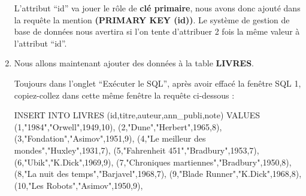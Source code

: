 \documentclass[
  a4paper,
  DIV=11,
  numbers=noendperiod]{scrartcl}
\newenvironment{Shaded}{\begin{snugshade}}{\end{snugshade}}
\newcommand{\DecValTok}[1]{\textcolor[rgb]{0.68,0.00,0.00}{#1}}
\newcommand{\KeywordTok}[1]{\textcolor[rgb]{0.00,0.23,0.31}{#1}}
\newcommand{\NormalTok}[1]{\textcolor[rgb]{0.00,0.23,0.31}{#1}}
\newcommand{\OtherTok}[1]{\textcolor[rgb]{0.00,0.23,0.31}{#1}}
\begin{document}
\begin{enumerate}
  L'attribut ``id'' va jouer le rôle de \textbf{clé primaire}, nous
  avons donc ajouté dans la requête la mention \textbf{(PRIMARY KEY
  (id))}. Le système de gestion de base de données nous avertira si l'on
  tente d'attribuer 2 fois la même valeur à l'attribut ``id''.
\item
  Nous allons maintenant ajouter des données à la table \textbf{LIVRES}.

  Toujours dans l'onglet ``Exécuter le SQL'', après avoir effacé la
  fenêtre SQL 1, copiez-collez dans cette même fenêtre la requête
  ci-dessous :

\begin{Shaded}
\begin{Highlighting}[]
\KeywordTok{INSERT} \KeywordTok{INTO}\NormalTok{ LIVRES}
\NormalTok{    (}\KeywordTok{id}\NormalTok{,titre,auteur,ann\_publi,note)}
    \KeywordTok{VALUES}
\NormalTok{    (}\DecValTok{1}\NormalTok{,}\OtherTok{"1984"}\NormalTok{,}\OtherTok{"Orwell"}\NormalTok{,}\DecValTok{1949}\NormalTok{,}\DecValTok{10}\NormalTok{),}
\NormalTok{    (}\DecValTok{2}\NormalTok{,}\OtherTok{"Dune"}\NormalTok{,}\OtherTok{"Herbert"}\NormalTok{,}\DecValTok{1965}\NormalTok{,}\DecValTok{8}\NormalTok{),}
\NormalTok{    (}\DecValTok{3}\NormalTok{,}\OtherTok{"Fondation"}\NormalTok{,}\OtherTok{"Asimov"}\NormalTok{,}\DecValTok{1951}\NormalTok{,}\DecValTok{9}\NormalTok{),}
\NormalTok{    (}\DecValTok{4}\NormalTok{,}\OtherTok{"Le meilleur des mondes"}\NormalTok{,}\OtherTok{"Huxley"}\NormalTok{,}\DecValTok{1931}\NormalTok{,}\DecValTok{7}\NormalTok{),}
\NormalTok{    (}\DecValTok{5}\NormalTok{,}\OtherTok{"Fahrenheit 451"}\NormalTok{,}\OtherTok{"Bradbury"}\NormalTok{,}\DecValTok{1953}\NormalTok{,}\DecValTok{7}\NormalTok{),}
\NormalTok{    (}\DecValTok{6}\NormalTok{,}\OtherTok{"Ubik"}\NormalTok{,}\OtherTok{"K.Dick"}\NormalTok{,}\DecValTok{1969}\NormalTok{,}\DecValTok{9}\NormalTok{),}
\NormalTok{    (}\DecValTok{7}\NormalTok{,}\OtherTok{"Chroniques martiennes"}\NormalTok{,}\OtherTok{"Bradbury"}\NormalTok{,}\DecValTok{1950}\NormalTok{,}\DecValTok{8}\NormalTok{),}
\NormalTok{    (}\DecValTok{8}\NormalTok{,}\OtherTok{"La nuit des temps"}\NormalTok{,}\OtherTok{"Barjavel"}\NormalTok{,}\DecValTok{1968}\NormalTok{,}\DecValTok{7}\NormalTok{),}
\NormalTok{    (}\DecValTok{9}\NormalTok{,}\OtherTok{"Blade Runner"}\NormalTok{,}\OtherTok{"K.Dick"}\NormalTok{,}\DecValTok{1968}\NormalTok{,}\DecValTok{8}\NormalTok{),}
\NormalTok{    (}\DecValTok{10}\NormalTok{,}\OtherTok{"Les Robots"}\NormalTok{,}\OtherTok{"Asimov"}\NormalTok{,}\DecValTok{1950}\NormalTok{,}\DecValTok{9}\NormalTok{),}

\end{Highlighting}
\end{Shaded}
\end{enumerate}
\end{document}
